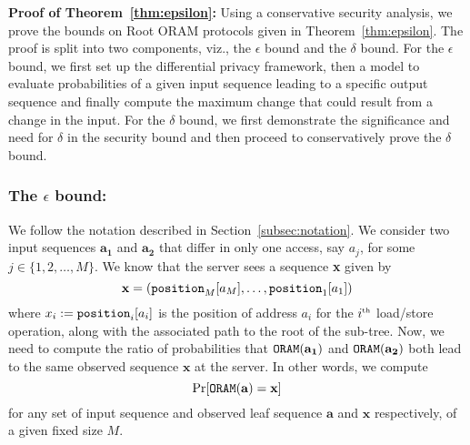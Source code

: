 \documentclass[USenglish,oneside,twocolumn]{article}
\newcommand{\ourprotocol}{Root ORAM}
\begin{document}
\textbf{Proof of Theorem~\ref{thm:epsilon}: }Using a conservative security analysis, we prove the bounds on \ourprotocol{} protocols given in Theorem~\ref{thm:epsilon}. The proof is split into two components, viz., the $\epsilon$ bound and the $\delta$ bound. For the $\epsilon$ bound, we first set up the differential privacy framework, then a model to evaluate probabilities of a given input sequence leading to a specific output sequence and finally compute the maximum change that could result from a change in the input. For the $\delta$ bound, we first demonstrate the significance and need for $\delta$ in the security bound and then proceed to conservatively prove the $\delta$ bound.

\vspace{-2em}
\subsubsection{\textbf{The $\epsilon$ bound}: }
\vspace{-1em}

We follow the notation described in Section~\ref{subsec:notation}. We consider two input sequences $\mathbf{a_1}$ and $\mathbf{a_2}$ that differ in only one access, say $a_j$, for some $j \in \{ 1, 2, \hdots , M \}$. We know that the server sees a sequence \textbf{x} given by 
$$
\boldsymbol{\mathrm{x}} = ({\tt position}_M[a_M], \hdots , {\tt position}_1[a_1])
$$
where $x_i := {\tt position}_i[a_i]$ is the position of address $a_i$ for the $i^{{\tiny \mbox{th}}}$ load/store operation, along with the associated path to the root of the sub-tree. Now, we need to compute the ratio of probabilities that ${\tt ORAM}(\mathbf{a_1})$ and ${\tt ORAM}(\mathbf{a_2})$ both lead to the same observed sequence $\mathbf{x}$ at the server. In other words, we compute 
$$
\Pr [{\tt ORAM}(\mathbf{a}) = \mathbf{x}] 
$$
for any set of input sequence and observed leaf sequence $\mathbf{a}$ and $\mathbf{x}$ respectively, of a given fixed size $M$.
\end{document}
